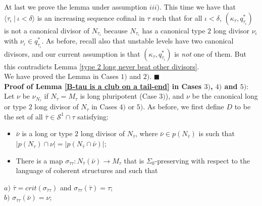\documentclass[12pt]{article}
\begin{document}
At last we prove the lemma under assumption $iii)$.  This time we have that $\langle \tau_\iota \ | \ \iota < \delta \rangle$ is an increasing sequence cofinal in $\tau$ such that for all $\iota < \delta$, $( \kappa_\tau , q_{\tau_\iota}^*)$ is not a canonical divisor of $N_{\tau_\iota}$ because $N_{\tau_\iota}$ has a canonical type $2$ long divisor $\nu_\iota$ with $\nu_\iota \in q_{\tau_\iota}^*$.  As before, recall also that unstable levels have two canonical divisors, and our current assumption is that $( \kappa_\tau , q_{\tau_\iota}^*)$ is \textit{not} one of them.  But this contradicts Lemma \ref{type 2 long never beat other divisors}.\\


We have proved the Lemma in Cases $1)$ and $2)$.  $\blacksquare$\\








\textbf{Proof of Lemma \ref{B-tau is a club on a tail-end} in Cases $3)$, $4)$ and $5)$}:\\









Let $\nu$ be $\nu_{N_\tau}$ if $N_\tau = M_\tau$ is long pluripotent (Case $3)$), and $\nu$ be the canonical long or type $2$ long divisor of $N_\tau$ in Cases $4)$ or $5)$.  As before, we first define $D$ to be the set of all $\bar{\tau} \in \mathcal{S}^1 \cap \tau$ satisfying:


\begin{itemize}
\item{$\bar{\nu}$ is a long or type $2$ long divisor of $N_{\bar{\tau}}$, where $\bar{\nu} \in p(N_{\bar{\tau}})$ is such that $|p(N_\tau) \cap \nu| = |p(N_{\bar{\tau}} \cap \bar{\nu} )|$;}
\item{There is a map $\sigma_{\bar{\tau} \tau } : N_{\bar{\tau}}(\bar{\nu}) \longrightarrow M_\tau$ that is $\Sigma_0$-preserving with respect to the language of coherent structures and such that}
\end{itemize}

\indent \indent $a)$ $\bar{\tau} = crit (\sigma_{\bar{\tau} \tau })$ and $\sigma_{\bar{\tau} \tau } (\bar{\tau}) = \tau $;\\

\indent \indent $b)$ $\sigma_{\bar{\tau} \tau } (\bar{\nu}) = \nu$;\\
\end{document}
